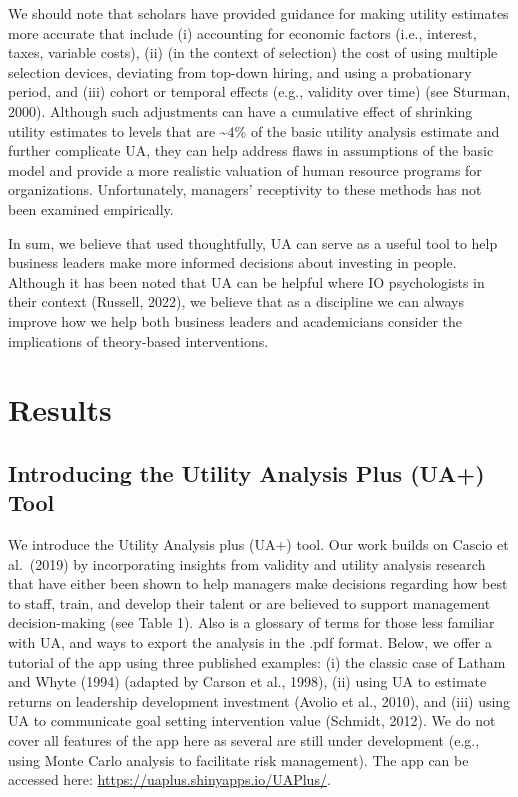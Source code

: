 \documentclass[
]{article}
\begin{document}
We should note that scholars have provided guidance for making utility
estimates more accurate that include (i) accounting for economic factors
(i.e., interest, taxes, variable costs), (ii) (in the context of
selection) the cost of using multiple selection devices, deviating from
top-down hiring, and using a probationary period, and (iii) cohort or
temporal effects (e.g., validity over time) (see Sturman, 2000).
Although such adjustments can have a cumulative effect of shrinking
utility estimates to levels that are \textasciitilde4\% of the basic
utility analysis estimate and further complicate UA, they can help
address flaws in assumptions of the basic model and provide a more
realistic valuation of human resource programs for organizations.
Unfortunately, managers' receptivity to these methods has not been
examined empirically.

In sum, we believe that used thoughtfully, UA can serve as a useful tool
to help business leaders make more informed decisions about investing in
people. Although it has been noted that UA can be helpful where IO
psychologists in their context (Russell, 2022), we believe that as a
discipline we can always improve how we help both business leaders and
academicians consider the implications of theory-based interventions.

\section{Results}\label{results}

\subsection{Introducing the Utility Analysis Plus (UA+)
Tool}\label{introducing-the-utility-analysis-plus-ua-tool}

We introduce the Utility Analysis plus (UA+) tool. Our work builds on
Cascio et al.~(2019) by incorporating insights from validity and utility
analysis research that have either been shown to help managers make
decisions regarding how best to staff, train, and develop their talent
or are believed to support management decision-making (see Table 1).
Also is a glossary of terms for those less familiar with UA, and ways to
export the analysis in the .pdf format. Below, we offer a tutorial of
the app using three published examples: (i) the classic case of Latham
and Whyte (1994) (adapted by Carson et al., 1998), (ii) using UA to
estimate returns on leadership development investment (Avolio et al.,
2010), and (iii) using UA to communicate goal setting intervention value
(Schmidt, 2012). We do not cover all features of the app here as several
are still under development (e.g., using Monte Carlo analysis to
facilitate risk management). The app can be accessed here:
\url{https://uaplus.shinyapps.io/UAPlus/}.
\end{document}

